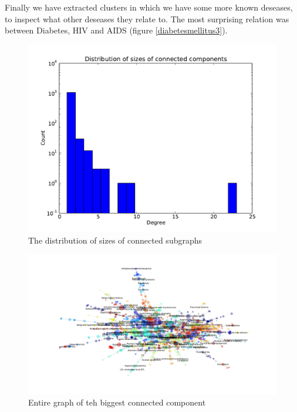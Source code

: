 \documentclass[a4paper,11pt]{article}
\begin{document}
Finally we have extracted clusters in which we have some more known deseases, to inspect what other deseases they relate to. The most surprising relation was between Diabetes, HIV and AIDS (figure \ref{diabetesmellitus3}). \\


\begin{figure}[htbp]
    \begin{center}
        \includegraphics[scale=0.3]{img/dsize.pdf}
        \caption{The distribution of sizes of connected subgraphs}
        \label{hist}
    \end{center}
\end{figure}

\begin{figure}[htbp]
    \begin{center}
        \includegraphics[scale=0.3]{img/full.pdf}
        \caption{Entire graph of teh biggest connected component}
        \label{full}
    \end{center}
\end{figure}
\end{document}
